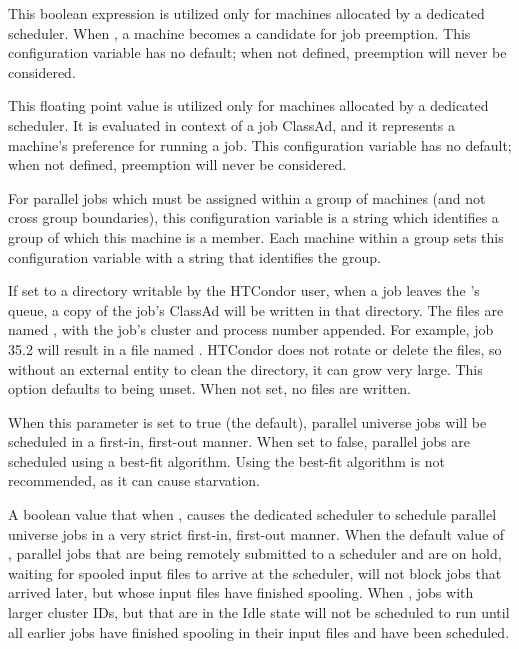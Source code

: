 \begin{description}
\label{param:ScheddPreemptionRequirements}
\item[\Macro{SCHEDD\_PREEMPTION\_REQUIREMENTS}]
  This boolean expression is
  utilized only for machines allocated by a dedicated scheduler.
  When , a machine becomes a candidate for job preemption.
  This configuration variable has no default;
  when not defined, preemption will never be considered.

\label{param:ScheddPreemptionRank}
\item[\Macro{SCHEDD\_PREEMPTION\_RANK}]
  This floating point value is
  utilized only for machines allocated by a dedicated scheduler.
  It is evaluated in context of a job ClassAd,
  and it represents a machine's preference for running a job.
  This configuration variable has no default;
  when not defined, preemption will never be considered.

\label{param:ParallelSchedulingGroup}
\item[\Macro{ParallelSchedulingGroup}]
  For parallel jobs which must be assigned within a group
  of machines (and not cross group boundaries),
  this configuration variable is a string which 
  identifies a group of which this machine is a member. 
  Each machine within a group sets this configuration variable with 
  a string that identifies the group.

\label{param:PerJobHistoryDir}
\item[\Macro{PER\_JOB\_HISTORY\_DIR}]
  If set to a directory writable by the HTCondor user, when a job
  leaves the 's queue, a copy of the job's ClassAd will
  be written in that directory.  The files are named ,
  with the job's cluster and process number appended.  
  For example, job 35.2 will result in a file named .
  HTCondor does not rotate or delete the files, so without an
  external entity to clean the directory, it can grow very large.
  This option defaults to being unset.  When not set, no
  files are written.

\label{param:DedicatedSchedulerUseFifo}
\item[\Macro{DEDICATED\_SCHEDULER\_USE\_FIFO}]
  When this parameter is set to true (the default), parallel 
  universe jobs will be scheduled in a first-in, first-out manner.
  When set to false, parallel jobs are scheduled using a
  best-fit algorithm. Using the best-fit algorithm is not recommended,
  as it can cause starvation.

\label{param:DedicatedSchedulerWaitForSpooler}
\item[\Macro{DEDICATED\_SCHEDULER\_WAIT\_FOR\_SPOOLER}]
  A boolean value that when , causes the dedicated scheduler to
  schedule parallel universe jobs in a very strict first-in, first-out manner.
  When the default value of , parallel jobs that are being remotely
  submitted to a scheduler and are on hold, waiting for spooled input
  files to arrive at the scheduler, will not block jobs that arrived later,
  but whose input files have finished spooling.  When ,
  jobs with larger cluster IDs, but that are in the Idle state will not
  be scheduled to run until all earlier jobs have finished spooling in
  their input files and have been scheduled.


\end{description}
